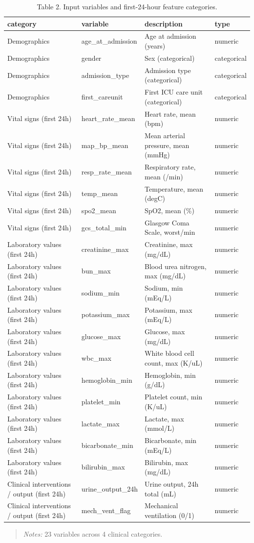 \begin{table}[htbp]
\centering
\caption{Table 2. Input variables and first-24-hour feature categories.}
\label{table2_input_variables}
\begin{tabular}{llll}
\toprule
category & variable & description & type \\
\midrule
Demographics & age\_at\_admission & Age at admission (years) & numeric \\
Demographics & gender & Sex (categorical) & categorical \\
Demographics & admission\_type & Admission type (categorical) & categorical \\
Demographics & first\_careunit & First ICU care unit (categorical) & categorical \\
Vital signs (first 24h) & heart\_rate\_mean & Heart rate, mean (bpm) & numeric \\
Vital signs (first 24h) & map\_bp\_mean & Mean arterial pressure, mean (mmHg) & numeric \\
Vital signs (first 24h) & resp\_rate\_mean & Respiratory rate, mean (/min) & numeric \\
Vital signs (first 24h) & temp\_mean & Temperature, mean (degC) & numeric \\
Vital signs (first 24h) & spo2\_mean & SpO2, mean (\%) & numeric \\
Vital signs (first 24h) & gcs\_total\_min & Glasgow Coma Scale, worst/min & numeric \\
Laboratory values (first 24h) & creatinine\_max & Creatinine, max (mg/dL) & numeric \\
Laboratory values (first 24h) & bun\_max & Blood urea nitrogen, max (mg/dL) & numeric \\
Laboratory values (first 24h) & sodium\_min & Sodium, min (mEq/L) & numeric \\
Laboratory values (first 24h) & potassium\_max & Potassium, max (mEq/L) & numeric \\
Laboratory values (first 24h) & glucose\_max & Glucose, max (mg/dL) & numeric \\
Laboratory values (first 24h) & wbc\_max & White blood cell count, max (K/uL) & numeric \\
Laboratory values (first 24h) & hemoglobin\_min & Hemoglobin, min (g/dL) & numeric \\
Laboratory values (first 24h) & platelet\_min & Platelet count, min (K/uL) & numeric \\
Laboratory values (first 24h) & lactate\_max & Lactate, max (mmol/L) & numeric \\
Laboratory values (first 24h) & bicarbonate\_min & Bicarbonate, min (mEq/L) & numeric \\
Laboratory values (first 24h) & bilirubin\_max & Bilirubin, max (mg/dL) & numeric \\
Clinical interventions / output (first 24h) & urine\_output\_24h & Urine output, 24h total (mL) & numeric \\
Clinical interventions / output (first 24h) & mech\_vent\_flag & Mechanical ventilation (0/1) & numeric \\
\bottomrule
\end{tabular}

\end{table}


\begin{quote}\small
\textit{Notes:} 23 variables across 4 clinical categories.
\end{quote}